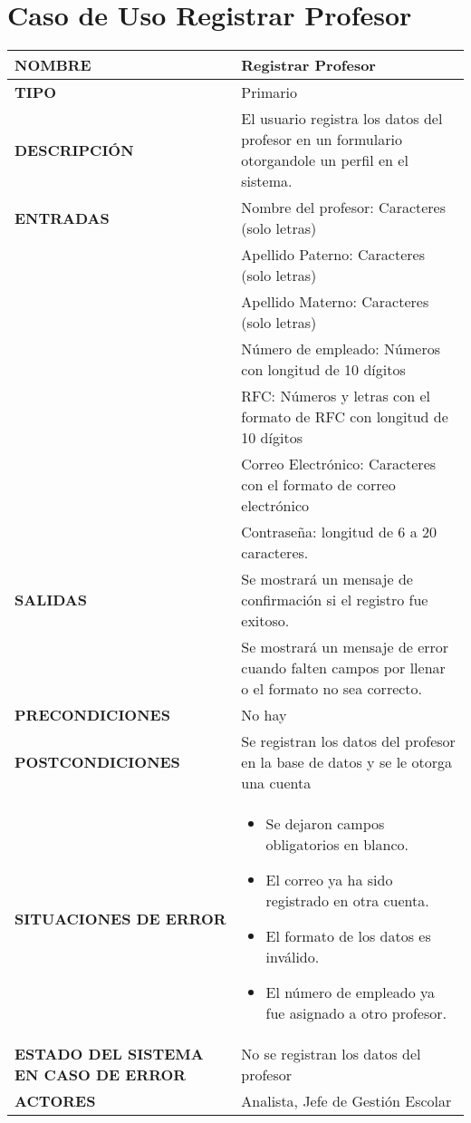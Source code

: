 \newpage
\section{Caso de Uso Registrar Profesor}
\begin{longtable}{ | p{6cm} | p{10cm} |}
\hline
\textbf{NOMBRE} & Registrar Profesor\\
\hline
\textbf{TIPO} & Primario\\
\hline
\textbf{DESCRIPCIÓN} & El usuario registra los datos del profesor en un formulario otorgandole un perfil en el sistema.\\
\hline
\textbf{ENTRADAS} & Nombre del profesor: Caracteres (solo letras)\\& Apellido Paterno: Caracteres (solo letras)\\& Apellido Materno: Caracteres (solo letras)\\&Número de empleado: Números con longitud de 10 dígitos\\&RFC: Números y letras con el formato de RFC con longitud de 10 dígitos\\& Correo Electrónico: Caracteres con el formato de correo electrónico\\& Contraseña: longitud de 6 a 20 caracteres.\\
\hline
\textbf{SALIDAS} & Se mostrará un mensaje de confirmación si el registro fue exitoso.\\& Se mostrará un mensaje de error cuando falten campos por llenar o el formato no sea correcto.\\
\hline
\textbf{PRECONDICIONES} & No hay\\
\hline
\textbf{POSTCONDICIONES} & Se registran los datos del profesor en la base de datos y se le otorga una cuenta\\
\hline
\textbf{SITUACIONES DE ERROR} & \begin{itemize}
    \item Se dejaron campos obligatorios en blanco.
    \item El correo ya ha sido registrado en otra cuenta.
    \item El formato de los datos es inválido.
    \item El número de empleado ya fue asignado a otro profesor.
\end{itemize}\\
\hline
\textbf{ESTADO DEL SISTEMA EN CASO DE ERROR} & No se registran los datos del profesor\\
\hline
\textbf{ACTORES} & Analista, Jefe de Gestión Escolar\\
\hline
\end{longtable}
